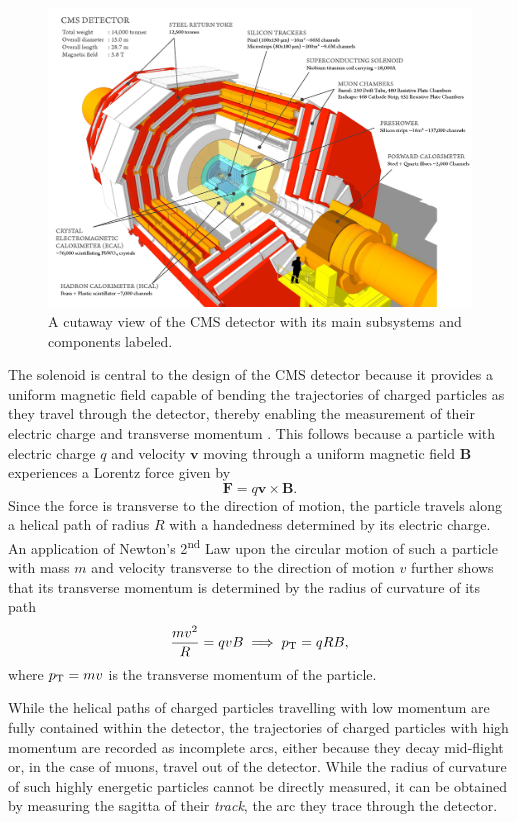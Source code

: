 \begin{figure}[htbp]
  \centering
    \includegraphics[width=5.5in]{images/cms_120918_03}
    \caption[Cutaway View of the CMS Detector]{A cutaway view of the CMS detector with its main subsystems and components labeled.\cite{CMScutaway}}
    \label{fig:CMScutaway}
\end{figure}

The solenoid is central to the design of the CMS detector because it provides a uniform magnetic field capable of bending the trajectories of charged particles as they travel through the detector, thereby enabling the measurement of their electric charge and transverse momentum \pT. This follows because a particle with electric charge $q$ and velocity $\mathbf{v}$ moving through a uniform magnetic field $\mathbf{B}$ experiences a Lorentz force given by
\begin{equation}
  \mathbf{F} = q\mathbf{v} \times \mathbf{B}.
\end{equation}
Since the force is transverse to the direction of motion, the particle travels along a helical path of radius $R$ with a handedness determined by its electric charge. An application of Newton's 2\textsuperscript{nd} Law upon the circular motion of such a particle with mass $m$ and velocity transverse to the direction of motion $v$ further shows that its transverse momentum is determined by the radius of curvature of its path
\begin{equation}
  \frac{mv^{2}}{R} = qvB \implies p_{\mathrm{T}} = qRB,
\end{equation}
where $p_{\mathrm{T}} = mv$ is the transverse momentum of the particle.

While the helical paths of charged particles travelling with low momentum are fully contained within the detector, the trajectories of charged particles with high momentum are recorded as incomplete arcs, either because they decay mid-flight or, in the case of muons, travel out of the detector. While the radius of curvature of such highly energetic particles cannot be directly measured, it can be obtained by measuring the sagitta of their \textit{track}, the arc they trace through the detector.

